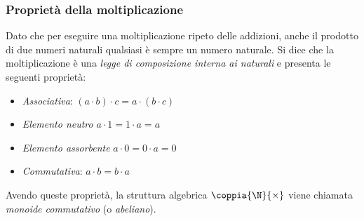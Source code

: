 % 

\subsubsection{Proprietà della moltiplicazione}

Dato che per eseguire una moltiplicazione ripeto delle addizioni, 
anche il prodotto di due numeri  naturali qualsiasi è sempre un numero 
naturale. 
Si dice che la moltiplicazione è una \emph{legge di composizione interna 
ai naturali} e presenta le seguenti 
proprietà:

\begin{itemize} [noitemsep]
 \item \emph{Associativa}: \((a \cdot b) \cdot c = a \cdot (b \cdot c)\)
 \item \emph{Elemento neutro} \(a \cdot 1 = 1 \cdot a = a\)
 \item \emph{Elemento assorbente} \(a \cdot 0 = 0 \cdot a = 0\)
 \item \emph{Commutativa}: \(a \cdot b = b \cdot a\)
\end{itemize}

Avendo queste proprietà, la struttura algebrica 
\(\coppia{\N}{\times}\) 
\ind{\(\coppia{\N}{\times}\)} viene chiamata \emph{monoide commutativo} (o 
\emph{abeliano}).


